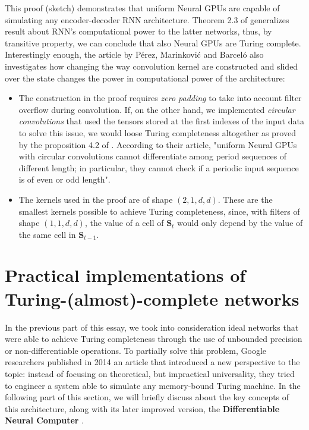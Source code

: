 \documentclass{article}
\begin{document}
This proof (sketch) demonstrates that uniform Neural GPUs are capable of simulating any encoder-decoder RNN architecture. Theorem 2.3 of \cite{PER19} generalizes \cite{SIE95} result about RNN's computational power to the latter networks, thus, by transitive property, we can conclude that also Neural GPUs are Turing complete. Interestingly enough, the article by Pérez, Marinković and Barceló also investigates how changing the way convolution kernel are constructed and slided over the state changes the power in computational power of the architecture:

\begin{itemize}
    \item The construction in the proof requires \textit{zero padding} to take into account filter overflow during convolution. If, on the other hand, we implemented \textit{circular convolutions} that used the tensors stored at the first indexes of the input data to solve this issue, we would loose Turing completeness altogether as proved by the proposition 4.2 of \cite{PER19}. According to their article, "uniform Neural GPUs with circular convolutions cannot differentiate among period sequences of different length; in particular, they cannot check if a periodic input sequence is of even or odd length".
    \item The kernels used in the proof are of shape $(2,1,d,d)$. These are the smallest kernels possible to achieve Turing completeness, since, with filters of shape $(1,1,d,d)$, the value of a cell of $\mathbf{S}_t$ would only depend by the value of the same cell in $\mathbf{S}_{t-1}$.
\end{itemize}

\section{Practical implementations of Turing-(almost)-complete networks}

In the previous part of this essay, we took into consideration ideal networks that were able to achieve Turing completeness through the use of unbounded precision or non-differentiable operations. To partially solve this problem, Google researchers published in 2014 an article \cite{GRA14} that introduced a new perspective to the topic: instead of focusing on theoretical, but impractical universality, they tried to engineer a system able to simulate any memory-bound Turing machine. In the following part of this section, we will briefly discuss about the key concepts of this architecture, along with its later improved version, the \textbf{Differentiable Neural Computer} \cite{GRA16}.
\end{document}
